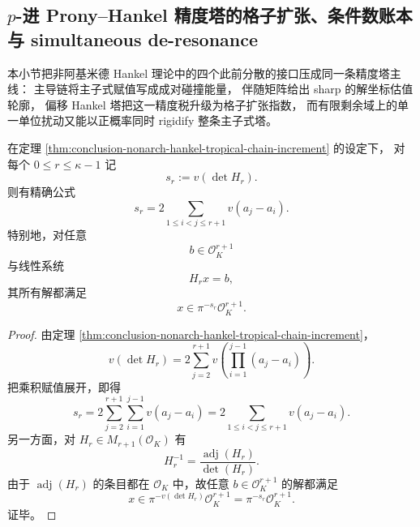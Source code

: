 \subsection{\texorpdfstring{$p$}{p}-进 Prony--Hankel 精度塔的格子扩张、条件数账本与 simultaneous de-resonance}\label{subsec:conclusion-padic-prony-lattice-deresonance-precisiontower}
本小节把非阿基米德 Hankel 理论中的四个此前分散的接口压成同一条精度塔主线：
主导链将主子式赋值写成成对碰撞能量，
伴随矩阵给出 sharp 的解坐标估值轮廓，
偏移 Hankel 塔把这一精度税升级为格子扩张指数，
而有限剩余域上的单一单位扰动又能以正概率同时 rigidify 整条主子式塔。

\begin{theorem}\label{thm:conclusion-padic-hankel-pairwise-collision-energy-precision-tax}
在定理 \ref{thm:conclusion-nonarch-hankel-tropical-chain-increment} 的设定下，
对每个 \(0\le r\le \kappa-1\) 记
\[
s_r:=v(\det H_r).
\]
则有精确公式
\[
s_r
=
2\sum_{1\le i<j\le r+1}v(a_j-a_i).
\]
特别地，对任意
\[
b\in \mathcal O_K^{r+1}
\]
与线性系统
\[
H_r x=b,
\]
其所有解都满足
\[
x\in \pi^{-s_r}\mathcal O_K^{r+1}.
\]
\end{theorem}
\begin{proof}
由定理 \ref{thm:conclusion-nonarch-hankel-tropical-chain-increment}，
\[
v(\det H_r)
=
2\sum_{j=2}^{r+1}v\!\left(\prod_{i=1}^{j-1}(a_j-a_i)\right).
\]
把乘积赋值展开，即得
\[
s_r
=
2\sum_{j=2}^{r+1}\sum_{i=1}^{j-1}v(a_j-a_i)
=
2\sum_{1\le i<j\le r+1}v(a_j-a_i).
\]
另一方面，对 \(H_r\in M_{r+1}(\mathcal O_K)\) 有
\[
H_r^{-1}=\frac{\operatorname{adj}(H_r)}{\det(H_r)}.
\]
由于 \(\operatorname{adj}(H_r)\) 的条目都在 \(\mathcal O_K\) 中，故任意 \(b\in\mathcal O_K^{r+1}\) 的解都满足
\[
x\in \pi^{-v(\det H_r)}\mathcal O_K^{r+1}
=
\pi^{-s_r}\mathcal O_K^{r+1}.
\]
证毕。
\end{proof}

